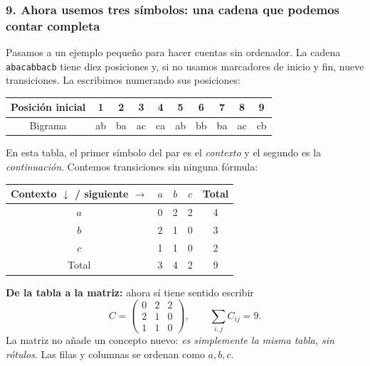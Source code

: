 \subsubsection*{9. Ahora usemos tres símbolos: una cadena que podemos contar completa}
Pasamos a un ejemplo pequeño para hacer cuentas sin ordenador. La cadena \texttt{abacabbacb} tiene diez posiciones y, si no usamos marcadores de inicio y fin, nueve transiciones. La escribimos numerando sus posiciones:
\begin{center}
\end{center}
\begin{center}
\begin{tabular}{c|ccccccccc}\toprule
Posición inicial &1&2&3&4&5&6&7&8&9\\\midrule
Bigrama & ab&ba&ac&ca&ab&bb&ba&ac&cb\\\bottomrule
\end{tabular}
\end{center}
En esta tabla, el primer símbolo del par es el \emph{contexto} y el segundo es la \emph{continuación}. Contemos transiciones sin ninguna fórmula:
\begin{center}
\begin{tabular}{c|ccc|c}\toprule
Contexto $\downarrow$ / siguiente $\to$ & $a$&$b$&$c$&Total\\\midrule
$a$&0&2&2&4\\
$b$&2&1&0&3\\
$c$&1&1&0&2\\\midrule
Total&3&4&2&9\\\bottomrule
\end{tabular}
\end{center}
\textbf{De la tabla a la matriz:} ahora sí tiene sentido escribir
\[
C=\begin{pmatrix}0&2&2\\2&1&0\\1&1&0\end{pmatrix},
\qquad\sum_{i,j}C_{ij}=9.
\]
La matriz no añade un concepto nuevo: \emph{es simplemente la misma tabla, sin rótulos}. Las filas y columnas se ordenan como $a,b,c$.

